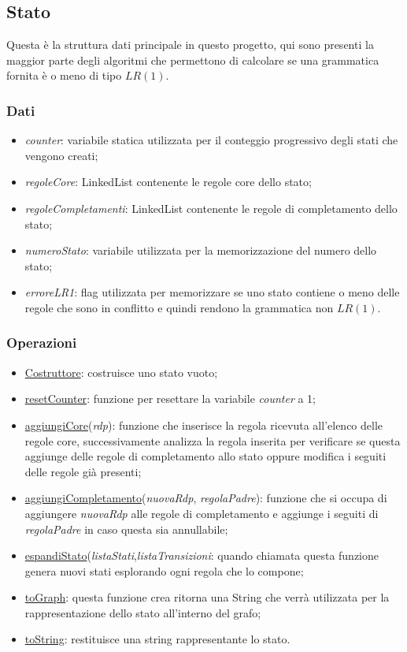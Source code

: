 \documentclass[12pt]{article}
\begin{document}
\subsection{Stato}
Questa è la struttura dati principale in questo progetto, qui sono presenti la maggior parte degli algoritmi che permettono di calcolare se una grammatica fornita è o meno di tipo $LR \left( 1 \right)$.
\subsubsection{Dati}
\begin{itemize}
\item\textit{counter}: variabile statica utilizzata per il conteggio progressivo degli stati che vengono creati;
\item\textit{regoleCore}: LinkedList contenente le regole core dello stato;
\item\textit{regoleCompletamenti}: LinkedList contenente le regole di completamento dello stato;
\item\textit{numeroStato}: variabile utilizzata per la memorizzazione del numero dello stato;
\item\textit{erroreLR1}: flag utilizzata per memorizzare se uno stato contiene o meno delle regole che sono in conflitto e quindi rendono la grammatica non $LR \left( 1 \right)$.
\end{itemize}
\subsubsection{Operazioni}
\begin{itemize}
\item\underline{Costruttore}: costruisce uno stato vuoto;
\item\underline{resetCounter}: funzione per resettare la variabile \textit{counter} a 1;
\item\underline{aggiungiCore}(\textit{rdp}): funzione che inserisce la regola ricevuta all'elenco delle regole core, successivamente analizza la regola inserita per verificare se questa aggiunge delle regole di completamento allo stato oppure modifica i seguiti delle regole già presenti;
\item\underline{aggiungiCompletamento}(\textit{nuovaRdp}, \textit{regolaPadre}): funzione che si occupa di aggiungere \textit{nuovaRdp} alle regole di completamento e aggiunge i seguiti di \textit{regolaPadre} in caso questa sia annullabile;
\item\underline{espandiStato}(\textit{listaStati},\textit{listaTransizioni}: quando chiamata questa funzione genera nuovi stati esplorando ogni regola che lo compone;
\item\underline{toGraph}: questa funzione crea ritorna una String che verrà utilizzata per la rappresentazione dello stato all'interno del grafo;
\item\underline{toString}: restituisce una string rappresentante lo stato.
\end{itemize}
\end{document}
